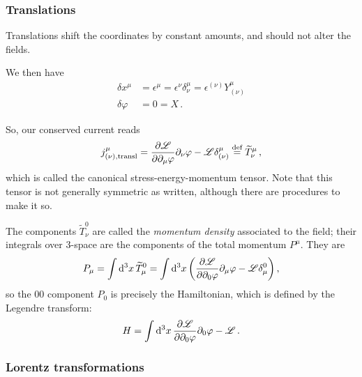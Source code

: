 \documentclass[main.tex]{subfiles}
\begin{document}
\subsubsection{Translations}

Translations shift the coordinates by constant amounts, and should not alter the fields. 

We then have 
%
\begin{subequations}
\begin{align}
\delta x^{\mu } &= \epsilon^{\mu } = \epsilon^{\nu } \delta^{\mu }_{\nu } = \epsilon^{(\nu)} Y^{\mu }_{(\nu )}  \\
\delta \varphi &= 0 = X
\,.
\end{align}
\end{subequations}

So, our conserved current reads 
%
\begin{align}
j^{\mu } _{(\nu), \text{transl}} = \pdv{\mathscr{L}}{\partial_{\mu } \varphi } \partial_{\nu } \varphi  -  \mathscr{L} \delta^{\mu }_{(\nu )} \overset{\text{def}}{=} \widetilde{T}^{\mu }_{\nu }
\,,
\end{align}
%
which is called the canonical stress-energy-momentum tensor.
Note that this tensor is not generally symmetric as written, although there are procedures to make it so. 

The components \(\widetilde{T}^{0}_{\nu }\) are called the \emph{momentum density} associated to the field; their integrals over 3-space are the components of the total momentum \(P^{\mu }\). They are 
%
\begin{align}
P_{\mu } = \int \dd[3]{x} \widetilde{T}^{0}_{\mu } = \int \dd[3]{x} \qty(\pdv{\mathscr{L}}{\partial_{0} \varphi } \partial_{\mu } \varphi  - \mathscr{L} \delta^{0}_{\mu })
\,,
\end{align}
%
so the \(00\) component \(P_{0}\) is precisely the Hamiltonian, which is defined by the Legendre transform: 
%
\begin{align}
H = \int \dd[3]{x} \pdv{\mathscr{L}}{\partial_{0} \varphi } \partial_{0} \varphi - \mathscr{L}
\,.
\end{align}

\subsubsection{Lorentz transformations}
\end{document}
